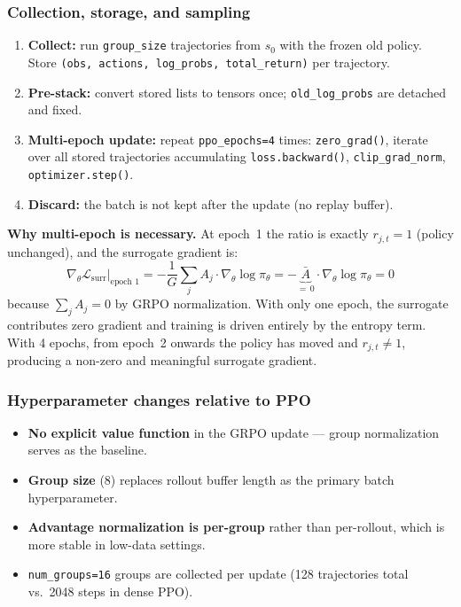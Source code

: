 \documentclass[11pt,letterpaper]{article}
\begin{document}
\subsubsection{Collection, storage, and sampling}

\begin{enumerate}
  \item \textbf{Collect:} run \texttt{group\_size} trajectories from $s_0$ with the frozen old policy. Store \texttt{(obs, actions, log\_probs, total\_return)} per trajectory.
  \item \textbf{Pre-stack:} convert stored lists to tensors once; \texttt{old\_log\_probs} are detached and fixed.
  \item \textbf{Multi-epoch update:} repeat \texttt{ppo\_epochs=4} times: \texttt{zero\_grad()}, iterate over all stored trajectories accumulating \texttt{loss.backward()}, \texttt{clip\_grad\_norm}, \texttt{optimizer.step()}.
  \item \textbf{Discard:} the batch is not kept after the update (no replay buffer).
\end{enumerate}

\textbf{Why multi-epoch is necessary.} At epoch~1 the ratio is exactly $r_{j,t}=1$ (policy unchanged), and the surrogate gradient is:
\[
  \nabla_\theta \mathcal{L}_\text{surr}\big|_{\text{epoch 1}}
  = -\frac{1}{G}\sum_j A_j \cdot \nabla_\theta \log \pi_\theta
  = -\underbrace{\bar{A}}_{=\,0} \cdot \nabla_\theta \log \pi_\theta = 0
\]
because $\sum_j A_j = 0$ by GRPO normalization. With only one epoch, the surrogate contributes zero gradient and training is driven entirely by the entropy term. With 4 epochs, from epoch~2 onwards the policy has moved and $r_{j,t} \neq 1$, producing a non-zero and meaningful surrogate gradient.

\subsubsection{Hyperparameter changes relative to PPO}

\begin{itemize}
  \item \textbf{No explicit value function} in the GRPO update — group normalization serves as the baseline.
  \item \textbf{Group size} (8) replaces rollout buffer length as the primary batch hyperparameter.
  \item \textbf{Advantage normalization is per-group} rather than per-rollout, which is more stable in low-data settings.
  \item \texttt{num\_groups=16} groups are collected per update (128 trajectories total vs.\ 2048 steps in dense PPO).
\end{itemize}
\end{document}

